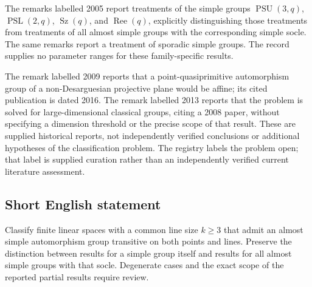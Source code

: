 \documentclass[11pt]{article}
\begin{document}
The remarks labelled 2005 report treatments of the simple groups \(\operatorname{PSU}(3,q)\), \(\operatorname{PSL}(2,q)\), \(\operatorname{Sz}(q)\), and \(\operatorname{Ree}(q)\), explicitly distinguishing those treatments from treatments of all almost simple groups with the corresponding simple socle. The same remarks report a treatment of sporadic simple groups. The record supplies no parameter ranges for these family-specific results.

The remark labelled 2009 reports that a point-quasiprimitive automorphism group of a non-Desarguesian projective plane would be affine; its cited publication is dated 2016. The remark labelled 2013 reports that the problem is solved for large-dimensional classical groups, citing a 2008 paper, without specifying a dimension threshold or the precise scope of that result. These are supplied historical reports, not independently verified conclusions or additional hypotheses of the classification problem. The registry labels the problem open; that label is supplied curation rather than an independently verified current literature assessment.
\subsection{Short English statement}
Classify finite linear spaces with a common line size \(k\geq 3\) that admit an almost simple automorphism group transitive on both points and lines. Preserve the distinction between results for a simple group itself and results for all almost simple groups with that socle. Degenerate cases and the exact scope of the reported partial results require review.
\end{document}
